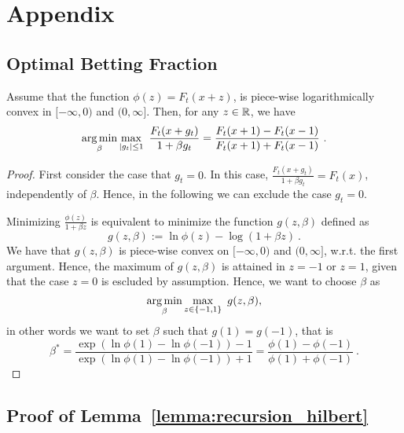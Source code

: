 \section{Appendix}

\subsection{Optimal Betting Fraction}
\begin{theorem}
\label{theo:opt_beta}
Assume that the function $\phi(z)=F_t(x+z)$, is piece-wise logarithmically convex in $[-\infty,0)$ and $(0,\infty]$. Then, for any $z\in \mathbb{R}$, we have
\[
\argmin_{\beta} \max_{|g_t|\leq 1} \ \frac{F_t(x+g_t)}{1 + \beta g_t} =\frac{F_t(x+1) - F_t(x-1)}{F_t(x+1) + F_t(x-1)}~.
\]
\end{theorem}
\begin{proof}
First consider the case that $g_t=0$. In this case, $\frac{F_t(x+g_t)}{1 + \beta g_t}=F_t(x)$, independently of $\beta$. Hence, in the following we can exclude the case $g_t=0$.

Minimizing $\frac{\phi(z)}{1+\beta z}$ is equivalent to minimize the function $g(z,\beta)$ defined as
\[
g(z,\beta) := \ln \phi(z) - \log(1+\beta z)~.
\]
We have that $g(z,\beta)$ is piece-wise convex on $[-\infty,0)$ and $(0,\infty]$, w.r.t. the first argument.
Hence, the maximum of $g(z,\beta)$ is attained in $z=-1$ or $z=1$, given that the case $z=0$ is escluded by assumption.
Hence, we want to choose $\beta$ as
\[
\argmin_{\beta} \max_{z \in \{-1, 1\}} \ g(z,\beta),
\]
in other words we want to set $\beta$ such that $g(1)=g(-1)$, that is
\[
\beta^* = \frac{\exp\left(\ln \phi(1) - \ln \phi(-1)\right)-1}{\exp\left(\ln \phi(1) - \ln \phi(-1)\right)+1} 
= \frac{\phi(1) - \phi(-1)}{\phi(1) + \phi(-1)}~.
\]
\end{proof}

\subsection{Proof of Lemma~\ref{lemma:recursion_hilbert}}

